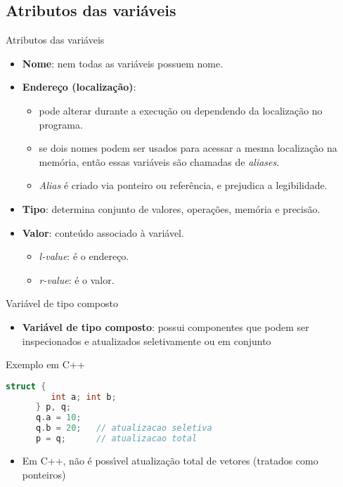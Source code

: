 \documentclass[handout,aspectratio=169]{beamer}
\newcommand{\bi}{\begin{itemize}[<+->]}
\newcommand{\ei}{\end{itemize}}
\begin{document}
\subsection{Atributos das vari\'{a}veis}

\begin{frame}{Atributos das vari\'{a}veis}

\begin{itemize}
\item \textbf{Nome}: nem todas as vari\'{a}veis possuem nome.
\item \textbf{Endere\c{c}o (localiza\c{c}\~{a}o)}:
\begin{itemize}
\item pode alterar durante a execu\c{c}\~{a}o ou dependendo da localiza\c{c}\~{a}o no programa.
\item se dois nomes podem ser usados para acessar a mesma localiza\c{c}\~{a}o na mem\'{o}ria, ent\~{a}o essas vari\'{a}veis s\~{a}o chamadas de \textit{aliases}.
\item \textit{Alias} \'{e} criado via ponteiro ou refer\^{e}ncia, e prejudica a legibilidade.
\end{itemize}
\item \textbf{Tipo}: determina conjunto de valores, opera\c{c}\~{o}es, mem\'{o}ria e precis\~{a}o.
\item \textbf{Valor}: conteúdo associado à vari\'{a}vel.
\begin{itemize}
\item \textit{l-value}: \'{e} o endere\c{c}o.
\item \textit{r-value}: \'{e} o valor.
\end{itemize}
\end{itemize}
\end{frame}

\begin{frame}[fragile]{Vari\'{a}vel de tipo composto}
   \bi 
   \item \textbf{Vari\'{a}vel de tipo composto}: possui componentes que podem ser inspecionados e atualizados seletivamente ou em conjunto
   \ei

\begin{block}{Exemplo em C++}
	\begin{lstlisting}[language=C,numbers=none]
      struct { 
         int a; int b; 
      } p, q;
      q.a = 10;
      q.b = 20;   // atualizacao seletiva
      p = q;      // atualizacao total	
	\end{lstlisting}
\end{block}	

      \bi 
      \item Em C++, n\~{a}o \'{e} poss\'{\i}vel atualiza\c{c}\~{a}o total de vetores (tratados como ponteiros)
      \ei
\end{frame}
\end{document}
